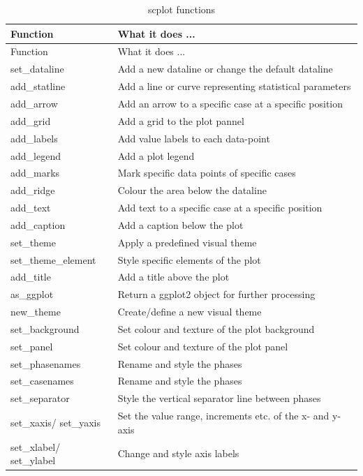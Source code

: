 \documentclass[
  letterpaper,
  DIV=11,
  numbers=noendperiod]{scrreprt}
\begin{document}
\hypertarget{tbl-functions-scplot}{}
\begin{longtable}[]{@{}ll@{}}
\caption{\label{tbl-functions-scplot}scplot functions}\tabularnewline
\toprule()
Function & What it does ... \\
\midrule()
\endfirsthead
\toprule()
Function & What it does ... \\
\midrule()
\endhead
set\_dataline & Add a new dataline or change the default dataline \\
add\_statline & Add a line or curve representing statistical
parameters \\
add\_arrow & Add an arrow to a specific case at a specific position \\
add\_grid & Add a grid to the plot pannel \\
add\_labels & Add value labels to each data-point \\
add\_legend & Add a plot legend \\
add\_marks & Mark specific data points of specific cases \\
add\_ridge & Colour the area below the dataline \\
add\_text & Add text to a specific case at a specific position \\
add\_caption & Add a caption below the plot \\
set\_theme & Apply a predefined visual theme \\
set\_theme\_element & Style specific elements of the plot \\
add\_title & Add a title above the plot \\
as\_ggplot & Return a ggplot2 object for further processing \\
new\_theme & Create/define a new visual theme \\
set\_background & Set colour and texture of the plot background \\
set\_panel & Set colour and texture of the plot panel \\
set\_phasenames & Rename and style the phases \\
set\_casenames & Rename and style the phases \\
set\_separator & Style the vertical separator line between phases \\
set\_xaxis/ set\_yaxis & Set the value range, increments etc. of the x-
and y-axis \\
set\_xlabel/ set\_ylabel & Change and style axis labels \\
\bottomrule()
\end{longtable}
\end{document}

